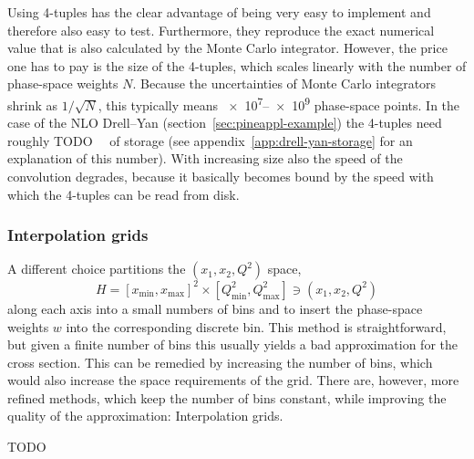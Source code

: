 Using 4-tuples has the clear advantage of being very easy to implement and therefore also easy to test.
Furthermore, they reproduce the exact numerical value that is also calculated by the Monte Carlo integrator.
However, the price one has to pay is the size of the 4-tuples, which scales linearly with the number of phase-space weights $N$.
Because the uncertainties of Monte Carlo integrators shrink as $1/\sqrt{N}$, this typically means \numrange{e7}{e9} phase-space points.
In the case of the NLO Drell--Yan (section~\ref{sec:pineappl-example}) the 4-tuples need roughly TODO~\si{\giga\byte} of storage (see appendix~\ref{app:drell-yan-storage} for an explanation of this number).
With increasing size also the speed of the convolution degrades, because it basically becomes bound by the speed with which the 4-tuples can be read from disk.

\subsubsection{Interpolation grids}

A different choice partitions the $(x_1, x_2, Q^2)$ space,
\begin{equation}
H = [x_\mathrm{min},x_\mathrm{max}]^2 \times [Q^2_\mathrm{min}, Q^2_\mathrm{max}] \ni (x_1, x_2, Q^2)
\end{equation}
along each axis into a small numbers of bins and to insert the phase-space weights $w$ into the corresponding discrete bin.
This method is straightforward, but given a finite number of bins this usually yields a bad approximation for the cross section.
This can be remedied by increasing the number of bins, which would also increase the space requirements of the grid.
There are, however, more refined methods, which keep the number of bins constant, while improving the quality of the approximation: Interpolation grids.

TODO
